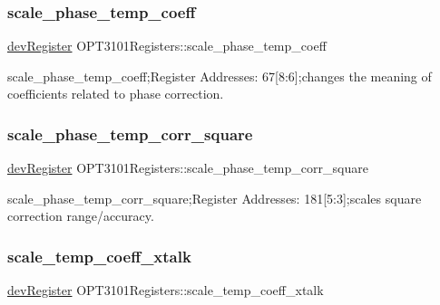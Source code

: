 \subsubsection{\texorpdfstring{scale\+\_\+phase\+\_\+temp\+\_\+coeff}{scale\_phase\_temp\_coeff}}
{\footnotesize\ttfamily \mbox{\hyperlink{classdev_register}{dev\+Register}} O\+P\+T3101\+Registers\+::scale\+\_\+phase\+\_\+temp\+\_\+coeff}



scale\+\_\+phase\+\_\+temp\+\_\+coeff;Register Addresses\+: 67\mbox{[}8\+:6\mbox{]};changes the meaning of coefficients related to phase correction. 

\mbox{\label{class_o_p_t3101_registers_a122cdf0dfa7e90063c9a351084a1c111}} 
\subsubsection{\texorpdfstring{scale\+\_\+phase\+\_\+temp\+\_\+corr\+\_\+square}{scale\_phase\_temp\_corr\_square}}
{\footnotesize\ttfamily \mbox{\hyperlink{classdev_register}{dev\+Register}} O\+P\+T3101\+Registers\+::scale\+\_\+phase\+\_\+temp\+\_\+corr\+\_\+square}



scale\+\_\+phase\+\_\+temp\+\_\+corr\+\_\+square;Register Addresses\+: 181\mbox{[}5\+:3\mbox{]};scales square correction range/accuracy. 

\mbox{\label{class_o_p_t3101_registers_a512cf2ca50b1fa7120df25bde9ac8ffe}} 
\subsubsection{\texorpdfstring{scale\+\_\+temp\+\_\+coeff\+\_\+xtalk}{scale\_temp\_coeff\_xtalk}}
{\footnotesize\ttfamily \mbox{\hyperlink{classdev_register}{dev\+Register}} O\+P\+T3101\+Registers\+::scale\+\_\+temp\+\_\+coeff\+\_\+xtalk}



